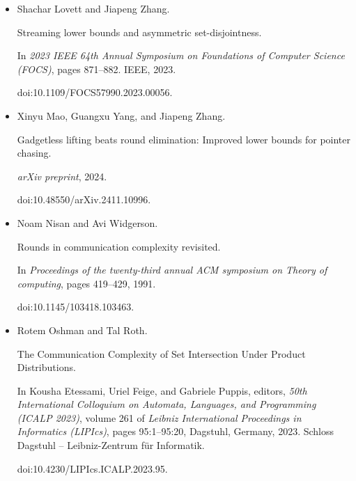 \begin{itemize}
doi:10.4230/LIPICS.CCC.2019.5.





\item[] 
[37]

Shachar Lovett and Jiapeng Zhang.


Streaming lower bounds and asymmetric set-disjointness.


In \emph{2023 IEEE 64th Annual Symposium on Foundations of Computer
Science (FOCS)}, pages 871–882. IEEE, 2023.


doi:10.1109/FOCS57990.2023.00056.





\item[] 
[38]

Xinyu Mao, Guangxu Yang, and Jiapeng Zhang.


Gadgetless lifting beats round elimination: Improved lower bounds for
pointer chasing.


\emph{arXiv preprint}, 2024.


doi:10.48550/arXiv.2411.10996.





\item[] 
[39]

Noam Nisan and Avi Widgerson.


Rounds in communication complexity revisited.


In \emph{Proceedings of the twenty-third annual ACM symposium on
Theory of computing}, pages 419–429, 1991.


doi:10.1145/103418.103463.





\item[] 
[40]

Rotem Oshman and Tal Roth.


The Communication Complexity of Set Intersection Under Product
Distributions.


In Kousha Etessami, Uriel Feige, and Gabriele Puppis, editors, \emph{50th International Colloquium on Automata, Languages, and Programming (ICALP
2023)}, volume 261 of \emph{Leibniz International Proceedings in Informatics
(LIPIcs)}, pages 95:1–95:20, Dagstuhl, Germany, 2023. Schloss Dagstuhl –
Leibniz-Zentrum für Informatik.


doi:10.4230/LIPIcs.ICALP.2023.95.






\end{itemize}
